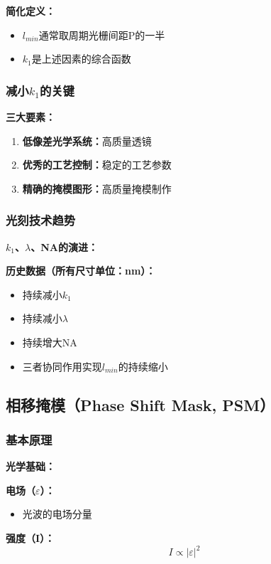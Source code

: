 \documentclass[UTF8,12pt,a4paper]{ctexart}
\begin{document}
\textbf{简化定义：}
\begin{itemize}
    \item $l_{min}$通常取周期光栅间距P的一半
    \item $k_1$是上述因素的综合函数
\end{itemize}

\subsubsection{减小$k_1$的关键}

\textbf{三大要素：}
\begin{enumerate}
    \item \textbf{低像差光学系统：}高质量透镜
    \item \textbf{优秀的工艺控制：}稳定的工艺参数
    \item \textbf{精确的掩模图形：}高质量掩模制作
\end{enumerate}

\subsubsection{光刻技术趋势}

\textbf{$k_1$、$\lambda$、NA的演进：}

\textbf{历史数据（所有尺寸单位：nm）：}
\begin{itemize}
    \item 持续减小$k_1$
    \item 持续减小$\lambda$
    \item 持续增大NA
    \item 三者协同作用实现$l_{min}$的持续缩小
\end{itemize}

\subsection{相移掩模（Phase Shift Mask, PSM）}

\subsubsection{基本原理}

\textbf{光学基础：}

\textbf{电场（$\varepsilon$）：}
\begin{itemize}
    \item 光波的电场分量
\end{itemize}

\textbf{强度（I）：}
\begin{equation}
I \propto |\varepsilon|^2
\end{equation}
\end{document}
